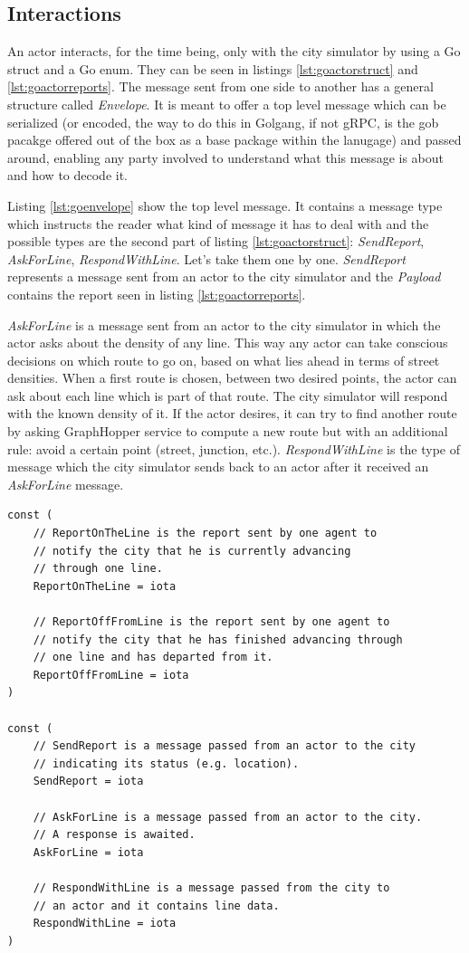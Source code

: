 \documentclass[conference]{IEEEtran}
\begin{document}
\subsection{Interactions}

An actor interacts, for the time being, only with the city simulator by using a Go struct and a Go enum. They can be seen in listings \ref{lst:goactorstruct} and \ref{lst:goactorreports}. The message sent from one side to another has a general structure called \textit{Envelope}. It is meant to offer a top level message which can be serialized (or encoded, the way to do this in Golgang, if not gRPC, is the gob pacakge offered out of the box as a base package within the lanugage) and passed around, enabling any party involved to understand what this message is about and how to decode it.

Listing \ref{lst:goenvelope} show the top level message. It contains a message type which instructs the reader what kind of message it has to deal with and the possible types are the second part of listing \ref{lst:goactorstruct}: \textit{SendReport}, \textit{AskForLine}, \textit{RespondWithLine}. Let's take them one by one. \textit{SendReport} represents a message sent from an actor to the city simulator and the \textit{Payload} contains the report seen in listing \ref{lst:goactorreports}. 

\textit{AskForLine} is a message sent from an actor to the city simulator in which the actor asks about the density of any line. This way any actor can take conscious decisions on which route to go on, based on what lies ahead in terms of street densities. When a first route is chosen, between two desired points, the actor can ask about each line which is part of that route. The city simulator will respond with the known density of it. If the actor desires, it can try to find another route by asking GraphHopper service to compute a new route but with an additional rule: avoid a certain point (street, junction, etc.). \textit{RespondWithLine} is the type of message which the city simulator sends back to an actor after it received an \textit{AskForLine} message.

\begin{lstlisting}[caption=Go enumerations for messaging, label=lst:goactorreports]
const (   
    // ReportOnTheLine is the report sent by one agent to
    // notify the city that he is currently advancing
    // through one line.
    ReportOnTheLine = iota
    
    // ReportOffFromLine is the report sent by one agent to
    // notify the city that he has finished advancing through
    // one line and has departed from it.
    ReportOffFromLine = iota
)
    
const (
    // SendReport is a message passed from an actor to the city
    // indicating its status (e.g. location).
    SendReport = iota
    
    // AskForLine is a message passed from an actor to the city.
    // A response is awaited.
    AskForLine = iota
    
    // RespondWithLine is a message passed from the city to
    // an actor and it contains line data.
    RespondWithLine = iota
)
\end{lstlisting}
\end{document}
